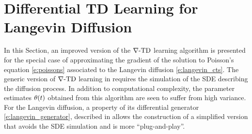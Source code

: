 \section{Differential TD Learning for Langevin Diffusion}
\label{s:diff_td_langevin}
In this Section, an improved version of the $\nabla\text{-TD}$ learning algorithm is presented for the special case of approximating the gradient of the solution to Poisson's equation \eqref{e:poissons} associated to the Langevin diffusion \eqref{e:langevin_cts}. The generic version of $\nabla\text{-TD}$ learning in  requires the simulation of the SDE describing the diffusion process.  In addition to computational complexity, the parameter estimates $\theta(t)$ obtained from this algorithm are seen to suffer from high variance. For the Langevin diffusion, a property of its differential generator \eqref{e:langevin_generator},  described in  allows the construction of a simplified version that avoids the SDE simulation and is more ``plug-and-play''. 

